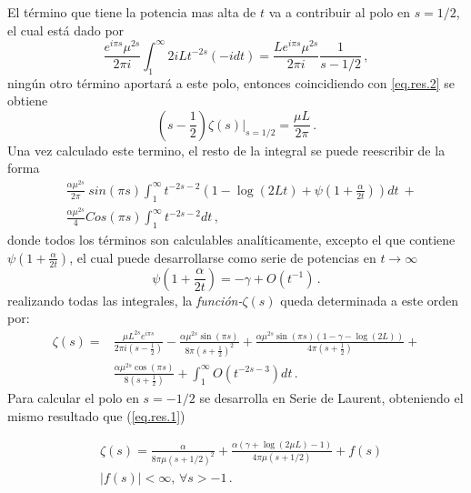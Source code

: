 El término que tiene la potencia mas alta de $t$ va a contribuir al polo en $s=1/2$, el cual está dado por
\begin{equation}
    \frac{e^{i \pi s} \mu ^{2s} }{2 \pi i }
    \int _1 ^{\infty}
    2 i L    
    t ^{-2 s}
    (-i dt) =  
    \frac{L e^{i \pi s} \mu ^{2s}}{2 \pi i} \frac{1}{s-1/2   }
    	\, ,
\end{equation}
ningún otro término aportará a este polo, entonces coincidiendo con \ref{eq.res.2} se obtiene
\begin{equation}
	\left(s- \frac{1}{2} \right)
    \zeta (s) \Big| _{s=1/2} = \frac{\mu L }{2 \pi} 
    	\, .
\end{equation}
Una vez calculado este termino, el resto de la integral se puede reescribir de la forma
\begin{align}
    & \frac{\alpha \mu ^{2s} }{2 \pi} \ sin(\pi s)
    \int _1 ^{\infty}
    t ^{-2 s-2} 
    \left(
    1 -  \log (2Lt) + \psi \left( 1 + \frac{\alpha}{2t} \right)
    \right) dt \ + 
    	\nonumber \\[5pt]
    &
    \frac{\alpha \mu ^{2s} }{4} 
    Cos(\pi s)
    \int _1 ^{\infty} t^{-2s-2} dt
    	\, ,
\end{align}
donde todos los términos son calculables analíticamente, excepto el que contiene $\psi \left( 1 + \frac{\alpha}{2t} \right)$, el cual puede desarrollarse como serie de potencias en $t \rightarrow \infty$
\begin{equation}
    \psi \left(1 + \frac{\alpha}{2 t} \right) =
    - \gamma + O \left( t^{-1} \right)
    \, .
\end{equation}
realizando todas las integrales, la {\it función-$\zeta (s)$} queda determinada a este orden por:  
\begin{equation}\label{eq.laurent}
\begin{aligned}
    \zeta  (s)  = 
    & \frac{\mu L ^{2 s} e ^{i \pi s}}{2 \pi i (s-\frac{1}{2})}  
    -\frac{\alpha \mu ^{2s} \sin(\pi s)}{8 \pi (s+\frac{1}{2}) ^2}  + 
    \frac{\alpha \mu ^{2s} \sin  (\pi s) (1 - \gamma -   \log (2 L))}{4 \pi (s+ \frac{1}{2} )} + \\
    & \frac{\alpha \mu ^{2s} \cos(\pi s)}{8 (s+\frac{1}{2} )} +
    \int _1 ^{\infty} O \left( t ^{-2s-3} \right) dt
    	\, .
\end{aligned}
\end{equation}
Para calcular el polo en $s=-1/2$ se desarrolla en Serie de Laurent, obteniendo el mismo resultado que (\ref{eq.res.1})


\begin{align}
\label{eq.result.zeta.c}
\nonumber	
    &\zeta  (s) =  \frac{\alpha}{8  \pi \mu (s+1/2)^2} +
    \frac{ \alpha ( \gamma  +  \log (2\mu L ) -1 ) }{4  \pi \mu (s+1/2) }  + 
	f (s) \\
	&| f(s) | < \infty , \, \forall s > -1
    	\, .
\end{align}


